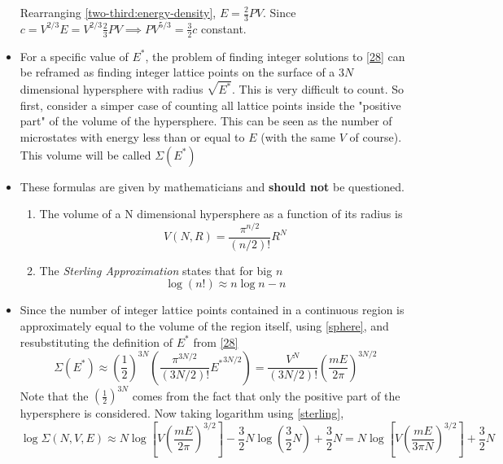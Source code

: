 \documentclass{article}
\begin{document}
\begin{itemize}
\begin{derivation}
        Rearranging \eqref{two-third:energy-density}, $E=\frac{2}{3}PV$. Since $c=V^{2/3}E=V^{2/3}\frac{2}{3}PV\implies PV^{5/3}=\frac{3}{2}c$ constant.
    \end{derivation}
    \item For a specific value of $E^*$, the problem of finding integer solutions to \eqref{28} can be reframed as finding integer lattice points on the surface of a $3N$ dimensional hypersphere with radius $\sqrt{E^*}$. This is very difficult to count. So first, consider a simper case of counting all lattice points inside the "positive part" of the volume of the hypersphere. This can be seen as the number of microstates with energy less than or equal to $E$ (with the same $V$ of course). This volume will be called $\Sigma(E^*)$
    \item These formulas are given by mathematicians and \textbf{should not} be questioned.
    \begin{enumerate}
        \item The volume of a N dimensional hypersphere as a function of its radius is \begin{equation}
            V(N,R)=\frac{\pi^{n/2}}{(n/2)!}R^N\label{sphere}
        \end{equation}
        \item The \textit{Sterling Approximation} states that for big $n$ \begin{equation}
            \log (n!)\approx n\log n-n\label{sterling}
        \end{equation}
    \end{enumerate}
    \item Since the number of integer lattice points contained in a continuous region is approximately equal to the volume of the region itself, using \eqref{sphere}, and resubstituting the definition of $E^*$ from \eqref{28}
    \begin{equation}
        \Sigma(E^*)\approx\left(\frac{1}{2}\right)^{3N}\left(\frac{\pi^{3N/2}}{(3N/2)!}{E^*}^{3N/2}\right)=\frac{V^N}{(3N/2)!}\left(\frac{mE}{2\pi}\right)^{3N/2}\label{33}
    \end{equation}
    Note that the $\left(\frac{1}{2}\right)^{3N}$ comes from the fact that only the positive part of the hypersphere is considered. Now taking logarithm using \eqref{sterling}, \begin{equation}
        \log\Sigma(N,V,E)\approx N\log\left[V\left(\frac{mE}{2\pi}\right)^{3/2}\right]-\frac{3}{2}N\log\left(\frac{3}{2}N\right)+\frac{3}{2}N=N\log\left[V\left(\frac{mE}{3\pi N}\right)^{3/2}\right]+\frac{3}{2}N\label{34}

\end{equation}
\end{itemize}
\end{document}
